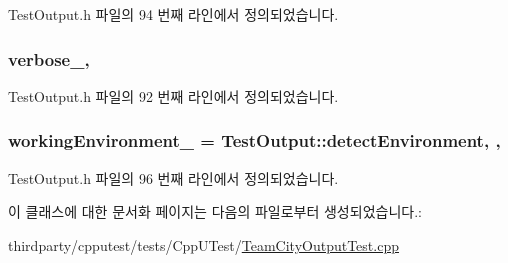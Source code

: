 Test\+Output.\+h 파일의 94 번째 라인에서 정의되었습니다.

\subsubsection[{\texorpdfstring{verbose\+\_\+}{verbose_}}]{ verbose\+\_\+\hspace{0.3cm}{\ttfamily [protected]}, {\ttfamily [inherited]}}\hypertarget{class_test_output_a86126da532c138842a42d8e9a52b0806}{}\label{class_test_output_a86126da532c138842a42d8e9a52b0806}


Test\+Output.\+h 파일의 92 번째 라인에서 정의되었습니다.

\subsubsection[{\texorpdfstring{working\+Environment\+\_\+}{workingEnvironment_}}]{ working\+Environment\+\_\+ = {\bf Test\+Output\+::detect\+Environment}\hspace{0.3cm}{\ttfamily [static]}, {\ttfamily [protected]}, {\ttfamily [inherited]}}\hypertarget{class_test_output_a8b622cfce4b95599cd31b61a777d68ef}{}\label{class_test_output_a8b622cfce4b95599cd31b61a777d68ef}


Test\+Output.\+h 파일의 96 번째 라인에서 정의되었습니다.



이 클래스에 대한 문서화 페이지는 다음의 파일로부터 생성되었습니다.\+:\begin{DoxyCompactItemize}
\item 
thirdparty/cpputest/tests/\+Cpp\+U\+Test/\hyperlink{_team_city_output_test_8cpp}{Team\+City\+Output\+Test.\+cpp}\end{DoxyCompactItemize}
